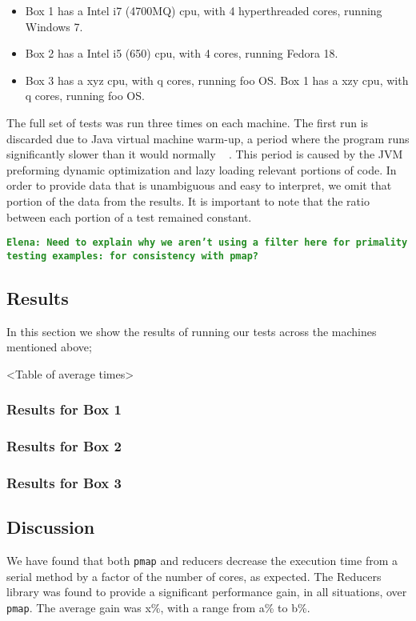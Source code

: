 \documentclass[12pt]{article}
\newcommand{\comment}[1]{{\bf \tt  {#1}}}
\newcommand{\emcomment}[1]{\textcolor{ForestGreen}{\comment{Elena: {#1}}}}
\newcommand{\clocode}[1]{{\texttt {#1}}}
\begin{document}
\begin{itemize}
 \item 
 Box 1 has a Intel i7 (4700MQ) cpu, with 4 hyperthreaded cores, running Windows 7.
 \item
 Box 2 has a Intel i5 (650) cpu, with 4 cores, running Fedora 18.
 \item
 Box 3 has a xyz cpu, with q cores, running foo OS. Box 1 has a xzy cpu, with q cores, running foo OS.
 \end{itemize}
  
The full set of tests was run three times on each machine. The first run is discarded due to Java virtual machine warm-up, a period where the program runs significantly slower than it would normally ~\cite{Blackburn:2008} . This period is caused by the JVM preforming dynamic optimization and lazy loading relevant portions of code. In order to provide data that is unambiguous and easy to interpret, we omit that portion of the data from the results. It is important to note that the ratio between each portion of a test remained constant.

\emcomment{Need to explain why we aren't using a filter here for primality testing examples: for consistency with pmap?}

\subsection{Results}\label{sec:results}
In this section we show the results of running our tests across the machines mentioned above;

<Table of average times>

\subsubsection{Results for Box 1}\label{sec:box1}
\subsubsection{Results for Box 2}\label{sec:box2}
\subsubsection{Results for Box 3}\label{sec:box3}


\subsection{Discussion}\label{sec:discussion}
We have found that both \clocode{pmap} and reducers decrease the execution time from a serial method by a factor of the number of cores, as expected. The Reducers library was found to provide a significant performance gain, in all situations, over \clocode{pmap}. The average gain was x\%, with a range from a\% to b\%.
\end{document}
